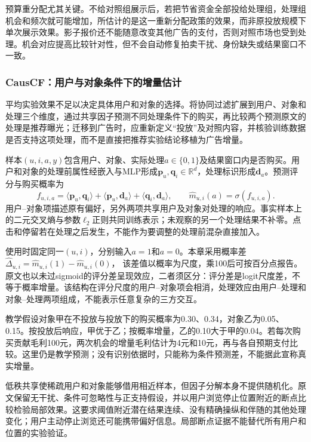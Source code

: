 预算重分配尤其关键。不给对照组展示后，若把节省资金全部投给处理组，处理组机会和频次就可能增加，所估计的是这一重新分配政策的效果，而非原投放规模下单次展示效果。影子报价还不能随意改变其他广告的支付，否则对照市场也受到处理。机会对应提高比较针对性，但不会自动修复拍卖干扰、身份缺失或结果窗口不一致。

\Needspace{90mm}
\subsubsection{CausCF：用户与对象条件下的增量估计}
\label{sec:rs-advertising-causcf}

平均实验效果不足以决定具体用户和对象的选择。将协同过滤扩展到用户、对象和处理三个维度，通过共享因子预测不同处理条件下的购买，再比较两个预测原文的处理是推荐曝光；迁移到广告时，应重新定义“投放”及对照内容，并核验训练数据是否支持这项处理，而不是直接把推荐实验结论移植为广告增量。

样本$(u,i,a,y)$包含用户、对象、实际处理$a\in\{0,1\}$及结果窗口内是否购买。用户和对象的处理前属性经嵌入与MLP形成$\bm{p}_u,\bm{q}_i\in\mathbb R^d$，处理标识形成$\bm{d}_a$。预测评分与购买概率为
\begin{equation}
  f_{u,i,a}
    =\langle\bm{p}_u,\bm{q}_i\rangle
      +\langle\bm{p}_u,\bm{d}_a\rangle
      +\langle\bm{q}_i,\bm{d}_a\rangle,\qquad
  \widehat m_{u,i}(a)=\sigma(f_{u,i,a}).
  \label{eq:rs-advertising-causcf}
\end{equation}
用户--对象项描述原有偏好，另外两项共享用户及对象对处理的响应。事实样本上的二元交叉熵与参数$\ell_2$正则共同训练表示；未观察的另一个处理结果不补零。点击和停留若在处理之后发生，不能作为要调整的处理前混杂直接加入。

使用时固定同一$(u,i)$，分别输入$a=1$和$a=0$。本章采用概率差
$\widehat\Delta_{u,i}=\widehat m_{u,i}(1)-\widehat m_{u,i}(0)$，
该差值以概率为尺度，乘100后可按百分点报告。原文也以未过sigmoid的评分差呈现效应，二者须区分：评分差是logit尺度差，不等于概率增量。该结构在评分尺度的用户--对象项会相消，处理效应由用户--处理和对象--处理两项组成，不能表示任意复杂的三方交互。

教学假设对象甲在不投放与投放下的购买概率为0.30、0.34，对象乙为0.05、0.15。按投放后响应，甲优于乙；按概率增量，乙的0.10大于甲的0.04。若每次购买贡献毛利100元，两次机会的增量毛利估计为4元和10元，再与各自预期支付比较。这里仍是教学预测；没有识别依据时，只能称为条件预测差，不能据此宣称真实增量。

低秩共享使稀疏用户和对象能够借用相近样本，但因子分解本身不提供随机化。原文保留无干扰、条件可忽略性与正支持假设，并以用户浏览停止位置附近的断点比较检验局部效果。这要求阈值附近潜在结果连续、没有精确操纵和伴随的其他处理变化；用户主动停止浏览还可能携带偏好信息。局部断点证据不能替代所有用户和位置的实验验证。

